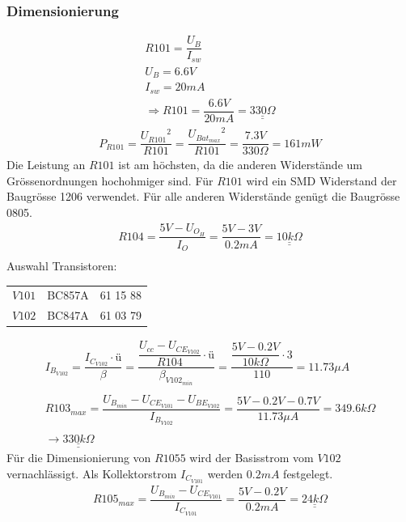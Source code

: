 \subsubsection{Dimensionierung}
\[ \begin{array}{l}
R101 = \dfrac{U_B}{I_{sw}}\\
U_B = 6.6 V\\
I_{sw} = 20 mA\\
\Rightarrow R101 = \dfrac{6.6V}{20mA} = \underline{\underline{330 \Omega}}
\end{array} \]
\[ \begin{array}{l}
P_{R101} = \dfrac{{U_{R101}}^2}{R101} = \dfrac{{U_{Bat_{max}}}^2}{R101} = \dfrac{7.3 V}{330 \Omega} = 161 mW
\end{array} \]
Die Leistung an $R101$ ist am höchsten, da die anderen Widerstände um Grössenordnungen hochohmiger sind. Für $R101$ wird ein SMD Widerstand der Baugrösse 1206 verwendet. Für alle anderen Widerstände genügt die Baugrösse 0805. 
%
\[ \begin{array}{l}
R104 = \dfrac{5 V - U_{O_H}}{I_O} = \dfrac{5 V - 3 V}{0.2 mA} = \underline{\underline{10 k \Omega}}\\
\end{array} \]
%
Auswahl Transistoren: \\
\begin{tabular}{lll}
$V101$ & BC857A & 61 15 88 \\
$V102$ & BC847A & 61 03 79 \\
\end{tabular}
%
\[ \begin{array}{l}
I_{B_{V102}} 
= \dfrac{I_{C_{V102}} \cdot ü}{\beta} 
= \dfrac{\dfrac{U_{cc} - U_{CE_{V102}}}{R104} \cdot ü}{\beta_{V102_{min}}} 
= \dfrac{\dfrac{5V - 0.2V}{10 k\Omega} \cdot 3}{110} = 11.73 \mu A\\\\
R103_{max} 
= \dfrac{U_{B_{min}} - U_{CE_{V101}} - U_{BE_{V102}}}{I_{B_{V102}}} 
= \dfrac{5 V - 0.2 V - 0.7 V}{11.73 \mu A} 
= 349.6 k \Omega\\\\
\rightarrow \underline{\underline{330 k\Omega}}
\end{array} \]
%
Für die Dimensionierung von $R1055$ wird der Basisstrom vom $V102$ vernachlässigt. Als Kollektorstrom $I_{C_{V101}}$ werden $0.2 mA$ festgelegt. 
\[ \begin{array}{l}
R105_{max} 
= \dfrac{U_{B_{min}} - U_{CE_{V101}}}{I_{C_{V101}}} 
= \dfrac{5 V - 0.2 V}{0.2 mA} = \underline{\underline{24 k \Omega}}\\
\end{array} \]
